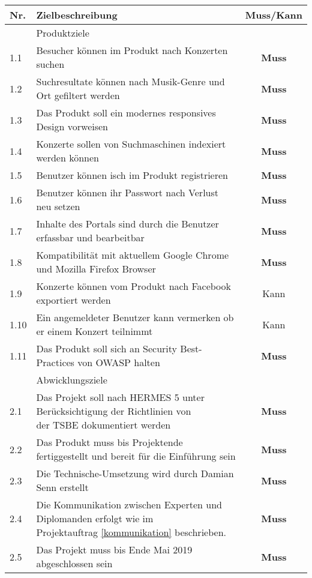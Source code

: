 \begin{longtable}[]{@{}llc@{}}
  \toprule
  Nr.  & Zielbeschreibung                                                                       & Muss/Kann\tabularnewline
  \toprule
       & Produktziele\tabularnewline
  \midrule
  1.1  & Besucher können im Produkt nach Konzerten suchen                                       & \textbf{Muss}\tabularnewline
  1.2  & Suchresultate können nach Musik-Genre und Ort gefiltert werden                         & \textbf{Muss}\tabularnewline
  1.3  & Das Produkt soll ein modernes responsives Design vorweisen                             & \textbf{Muss}\tabularnewline
  1.4  & Konzerte sollen von Suchmaschinen indexiert werden können                              & \textbf{Muss}\tabularnewline
  1.5  & Benutzer können isch im Produkt registrieren                                           & \textbf{Muss}\tabularnewline
  1.6  & Benutzer können ihr Passwort nach Verlust neu setzen                                   & \textbf{Muss}\tabularnewline
  1.7  & Inhalte des Portals sind durch die Benutzer erfassbar und bearbeitbar                  & \textbf{Muss}\tabularnewline
  1.8  & Kompatibilität mit aktuellem Google Chrome und Mozilla Firefox Browser                 & \textbf{Muss}\tabularnewline
  1.9  & Konzerte können vom Produkt nach Facebook exportiert werden                            & Kann\tabularnewline
  1.10 & Ein angemeldeter Benutzer kann vermerken ob er einem Konzert teilnimmt                 & Kann\tabularnewline
  1.11 & Das Produkt soll sich an Security Best-Practices von OWASP halten                      & \textbf{Muss}\tabularnewline
  \bottomrule
       & Abwicklungsziele\tabularnewline
  \midrule
  2.1  & \makecell[l]{Das Projekt soll nach HERMES 5 unter Berücksichtigung der Richtlinien von                                \\ der TSBE dokumentiert werden} & \textbf{Muss}\tabularnewline
  2.2  & Das Produkt muss bis Projektende fertiggestellt und bereit für die Einführung sein     & \textbf{Muss}\tabularnewline
  2.3  & Die Technische-Umsetzung wird durch Damian Senn erstellt                               & \textbf{Muss}\tabularnewline
  2.4  & \makecell[l]{Die Kommunikation zwischen Experten und Diplomanden erfolgt wie im                                       \\ Projektauftrag \ref{kommunikation} beschrieben.} & \textbf{Muss}\tabularnewline
  2.5  & Das Projekt muss bis Ende Mai 2019 abgeschlossen sein                                  & \textbf{Muss}\tabularnewline
  \bottomrule
\end{longtable}
